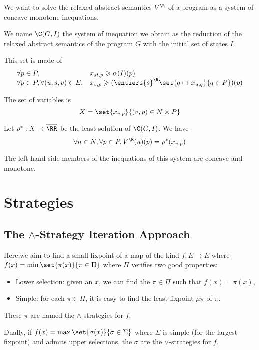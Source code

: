 \documentclass[a4paper, twoside, 10pt]{article}
\begin{document}
We want to solve the relaxed abstract semantics $V^\R$ of a program as a system of concave monotone inequations.

We name $\C(G, I)$ the system of inequation we obtain as the reduction of the relaxed abstract semantics of the program $G$ with the initial set of states $I$.

This set is made of
\[
    \begin{array}{ll}
        \forall p\in P, &x_{st, p} \geqslant \alpha(I)(p) \\
        \forall p \in P, \forall (u,s,v)\in E, &x_{v, p} \geqslant (\entiers{s}^\R\set{q\mapsto x_{u,q}}{q \in P})(p) 
    \end{array}
\]

The set of variables is 
\[
    X = \set{x_{v, p}}{(v,p)\in N\times P}
\]

\begin{lemma}
    Let $\rho^*:X\to \overline{\RR}$ be the least solution of $\C(G,I)$. We have
    \[
        \forall n\in N,\forall p\in P, V^\R(u)(p) = \rho^*(x_{v, p})
    \]
\end{lemma}

The left hand-side members of the inequations of this system are concave and monotone.

\section{Strategies}

\subsection{The \texorpdfstring{$\wedge$}{Min}-Strategy Iteration Approach}

Here,we aim to find a small fixpoint of a map of the kind $ f:E\to E$ where $f(x) = \min\set{\pi(x)}{\pi\in\Pi}$ where $\Pi$ verifies two good properties:
\begin{itemize}
    \item Lower selection: given an $x$, we can find the $\pi \in \Pi$ such that $f(x) = \pi(x)$,
    \item Simple: for each $\pi \in \Pi$, it is easy to find the least fixpoint $\mu\pi$ of $\pi$.
\end{itemize}

These $\pi$ are named the $\wedge$-strategies for $f$.

Dually, if $f(x) = \max\set{\sigma(x)}{\sigma\in\Sigma}$ where $\Sigma$ is simple (for the largest fixpoint) and admits upper selections, the $\sigma$ are the $\vee$-strategies for $f$.
\end{document}
